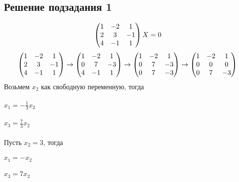 \documentclass{article}
\begin{document}
   \subsection{Решение подзадания 1}
   
    \[
    \begin{pmatrix}
        1 & -2 & 1 \\
        2 & 3 & -1 \\
        4 & -1 & 1 \\
    \end{pmatrix}X=0 \\
    \]
    \[
    \begin{pmatrix}
        1 & -2 & 1 \\
        2 & 3 & -1 \\
        4 & -1 & 1 \\
    \end{pmatrix} 
    \to
    \begin{pmatrix}
        1 &	-2 & 1 \\
        0 & 7 & -3 \\
        4 & -1 & 1 \\
    \end{pmatrix}
    \to
    \begin{pmatrix}
        1 &	-2 & 1 \\
        0 & 7 & -3 \\
        0 & 7 & -3 \\
    \end{pmatrix}
    \to
    \begin{pmatrix}
        1 &	-2 & 1 \\
        0 & 0 & 0 \\
        0 & 7 & -3 \\
    \end{pmatrix} \\ \\ 
    \]
    Возьмем $x_2$ как свободную переменную, тогда \\ \\
    $x_1 = -\frac{1}{3}x_2$ \\ \\
    $x_3 = \frac{7}{3}x_2$ \\ \\
    Пусть $x_2 = 3$, тогда \\ \\
    $x_1 = -x_2$ \\ \\
    $x_3 = 7x_2$ \\ \\
\end{document}

